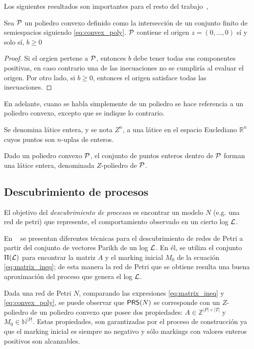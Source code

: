 Los siguientes resultados son importantes para el resto del trabajo~\cite{CarmonaC14},

\begin{theorem}
\label{theo:orig_in_b_pos}
    Sea ${\mathcal P}$ un poliedro convexo definido como la intersección de un conjunto
    finito de semiespacios siguiendo \eqref{eq:convex_poly}. ${\mathcal P}$ contiene el 
    origen \mbox{$z=(0,\ldots,0)$} sí y solo sí, $b \geq 0$
\end{theorem}

\begin{proof}
    Si el orgien pertene a ${\mathcal P}$, entonces $b$ debe tener todas sus componentes positivas,
    en caso contrario una de las inecuaciones no se cumpliría al evaluar el origen.
    Por otro lado, si $b \geq 0$, entonces el origen satisface todas las inecuaciones.
\end{proof}

En adelante, cuano se habla simplemente de un poliedro se hace referencia a un poliedro convexo,
excepto que se indique lo contrario.

Se denomina látice entera, y se nota $Z^n$, a una látice en el espacio Euclediano $\mathbb{R}^n$
cuyos puntos son $n$-uplas de enteros. 

Dado un poliedro convexo ${\mathcal P}$, el conjunto de puntos enteros dentro de ${\mathcal P}$
forman una látice entera, denominada $Z$-poliedro de ${\mathcal P}$.

\subsection{Descubrimiento de procesos} 
\label{sec:2.discovery discovery}

El objetivo del \textit{descubrimiento de procesos} es encontrar un 
modelo $N$ (e.g. una red de petri) que represente, el comportamiento 
observado en un cierto log ${\mathcal L}$.

En ~\cite{CarmonaC14} se presentan diferentes técnicas 
para el descubrimiento de redes de Petri a partir del 
conjunto de vectores Parikh de un log ${\mathcal L}$.
En él, se utiliza el conjunto $\Pi({\mathcal L})$ para encontrar
la matriz $A$ y el marking inicial $M_0$ de la ecuación \eqref{eq:matrix_ineq};
de esta manera la red de Petri que se obtiene resulta 
una buena aproximación del proceso que genera el log ${\mathcal L}$.

Dada una red de Petri $N$, comparando las expresiones \eqref{eq:matrix_ineq}
y \eqref{eq:convex_poly}, se puede observar que $\textsf{PRS}(N)$ se corresponde con
un $Z$-poliedro de un poliedro convexo que posee dos propiedades:
\mbox{$A \in \mathbb{Z}^{|P|\times|T|}$} y \mbox{$M_0 \in \mathbb{N}^{|P|}$}.
Estas propiedades, son garantizadas por el proceso de construcción ya que el
marking inicial es siempre no negativo y sólo markings con valores enteros positivos
son alcanzables.


